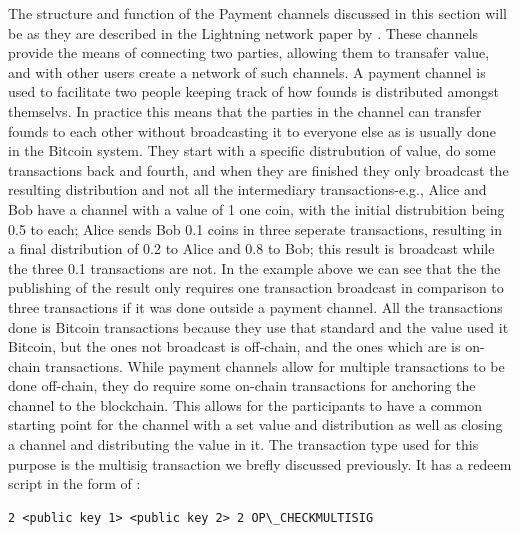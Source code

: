 The structure and function of the Payment channels discussed in this section will be as they are described in the Lightning network paper by . These channels provide the means of connecting two parties, allowing them to transafer value, and with other users create a network of such channels. A payment channel is used to facilitate two people keeping track of how founds is distributed amongst themselvs. In practice this means that the parties in the channel can transfer founds to each other without broadcasting it to everyone else as is usually done in the Bitcoin system. They start with a specific distrubution of value, do some transactions back and fourth, and when they are finished they only broadcast the resulting distribution and not all the intermediary transactions-e.g., Alice and Bob have a channel with a value of 1 one coin, with the initial distrubition being 0.5 to each; Alice sends Bob 0.1 coins in three seperate transactions, resulting in a final distribution of 0.2 to Alice and 0.8 to Bob; this result is broadcast while the three 0.1 transactions are not.
In the example above we can see that the the publishing of the result only requires one transaction broadcast in comparison to three transactions if it was done outside a payment channel. All the transactions done is Bitcoin transactions because they use that standard and the value used it Bitcoin, but the ones not broadcast is off-chain, and the ones which are is on-chain transactions.
While payment channels allow for multiple transactions to be done off-chain, they do require some on-chain transactions for anchoring the channel to the blockchain. This allows for the participants to have a common starting point for the channel with a set value and distribution as well as closing a channel and distributing the value in it.
The transaction type used for this purpose is the multisig transaction we brefly discussed previously. It has a redeem script in the form of \cite{bolt3}:

\begin{verbatim}
2 <public key 1> <public key 2> 2 OP\_CHECKMULTISIG
\end{verbatim}

